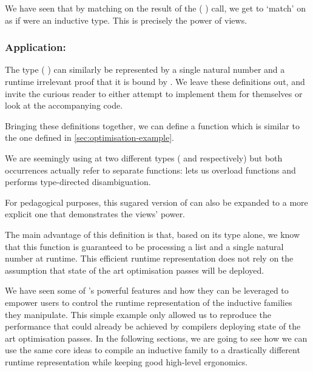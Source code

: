 We have seen that by matching on the result of the
( ) call,
we get to `match' on  as if  were an
inductive type.
%
This is precisely the power of views.

\subsubsection{Application: }

The type ( ) can similarly be represented by a
single natural number and a runtime irrelevant proof that it is bound by
.
%
We leave these definitions out, and invite the curious reader
to either attempt to implement them for themselves or look at the accompanying code.

Bringing these definitions together, we can define a 
function which is  similar to the one defined in \cref{sec:optimisation-example}.


We are seemingly using  at two different types (
and  respectively) but both occurrences actually refer to separate
functions: \idris{} lets us overload functions and performs type-directed disambiguation.

For pedagogical purposes, this sugared version of  can
also be expanded to a more explicit one that demonstrates the views' power.



The main advantage of this definition is that, based on its type alone, we know
that this function is guaranteed to be processing a list and a single natural
number at runtime.
%
This efficient runtime representation does not rely on the assumption that state
of the art optimisation passes will be deployed.


We have seen some of \idris{}'s powerful features and how they can be leveraged
to empower users to control the runtime representation of the inductive families
they manipulate.
%
This simple example only allowed us to reproduce the performance that could already
be achieved by compilers deploying state of the art optimisation passes.
%
In the following sections, we are going to see how we can use the same core ideas
to compile an inductive family to a drastically different runtime representation
while keeping good high-level ergonomics.
